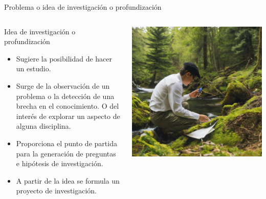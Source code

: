 \documentclass [xcolor=svgnames, t] {beamer}
\begin{document}
\begin{frame}{Problema o idea de investigaci\'on o profundizaci\'on}
\begin{columns}
\vspace{-5cm}
\begin{exampleblock}{Idea de investigaci\'on o profundizaci\'on}
\begin{itemize}
\item Sugiere la posibilidad de hacer un estudio.
\item Surge de la observaci\'on de un problema o la detecci\'on de una brecha en el conocimiento. O del inter\'es de explorar un aspecto de alguna disciplina.
\item Proporciona el punto de partida para la generaci\'on de preguntas e hip\'otesis de investigaci\'on.
\item A partir de la idea se formula un proyecto de investigaci\'on.
\end{itemize}
\end{exampleblock}
\includegraphics[width=\textwidth]{fig3_1}
\end{columns}
\end{frame}
\end{document}

